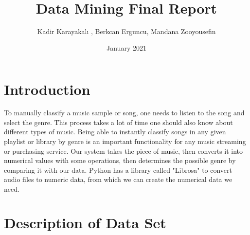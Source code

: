 \documentclass{article}
\title{Data Mining Final Report }
\author{Kadir Karayakalı , Berkcan Erguncu, Mandana Zooyousefin  }
\date{January 2021}
\begin{document}
\maketitle

\section{Introduction}

To manually classify a music sample or song, one needs to listen to the song and select the genre. This process takes a lot of time one should also know about different types of music. Being able to instantly classify songs in any given playlist or library by genre is an important functionality for any music streaming or purchasing service. Our system takes the piece of music, then converts it into numerical values with some operations, then determines the possible genre by comparing it with our data. Python has a library called "Librosa" to convert audio files to numeric data, from which we can create the numerical data we need.



\section{ Description of Data Set}
\end{document}
